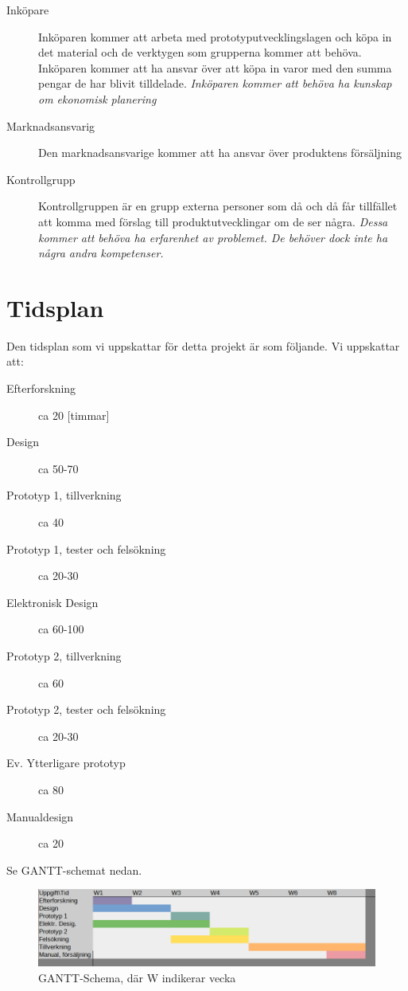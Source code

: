 \documentclass{article}
\begin{document}
\begin{description}
		\item[Inköpare] Inköparen kommer att arbeta med prototyputvecklingslagen och köpa in det material och de verktygen som grupperna kommer att behöva. Inköparen kommer att ha ansvar över att köpa in varor med den summa pengar de har blivit tilldelade. \textit{Inköparen kommer att behöva ha kunskap om ekonomisk planering}
		\item[Marknadsansvarig] Den marknadsansvarige kommer att ha ansvar över produktens försäljning
		\item[Kontrollgrupp] Kontrollgruppen är en grupp externa personer som då och då får tillfället att komma med förslag till produktutvecklingar om de ser några. \textit{Dessa kommer att behöva ha erfarenhet av problemet. De behöver dock inte ha några andra kompetenser.}
	\end{description}

	
	\pagebreak 
	\section{Tidsplan}
	Den tidsplan som vi uppskattar för detta projekt är som följande. Vi uppskattar att:
	\begin{description}
	\item[Efterforskning] ca 20 [timmar]
	\item[Design] ca 50-70
	\item[Prototyp 1, tillverkning] ca 40 
	\item[Prototyp 1, tester och felsökning] ca 20-30
	\item[Elektronisk Design] ca 60-100
	\item[Prototyp 2, tillverkning] ca 60
 	\item[Prototyp 2, tester och felsökning] ca 20-30
	\item[Ev. Ytterligare prototyp] ca 80
	\item[Manualdesign] ca 20 
	\end{description}
	Se GANTT-schemat nedan.
	\begin{figure}[h]
		\includegraphics[width=\linewidth]{gantt1.png}
		\caption{GANTT-Schema, där W indikerar vecka}
		\label{fig: GANTT1}
		\centering
	\end{figure}
	
\end{document}
